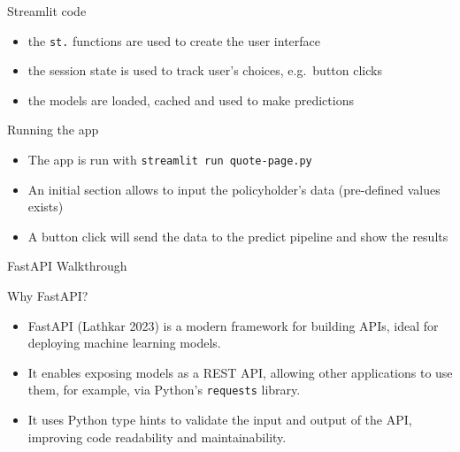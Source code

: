 \documentclass[
  ignorenonframetext,
]{beamer}
\providecommand{\tightlist}{%
  \setlength{\itemsep}{0pt}\setlength{\parskip}{0pt}}
\begin{document}
\begin{frame}[fragile]
\begin{block}{Streamlit code}
\label{streamlit-code}
\begin{itemize}
\tightlist
\item
  the \texttt{st.} functions are used to create the user interface
\item
  the session state is used to track user's choices, e.g.~button clicks
\item
  the models are loaded, cached and used to make predictions
\end{itemize}
\end{block}
\end{frame}

\begin{frame}[fragile]
\begin{block}{Running the app}
\label{running-the-app}
\begin{itemize}
\tightlist
\item
  The app is run with \texttt{streamlit\ run\ quote-page.py}
\item
  An initial section allows to input the policyholder's data
  (pre-defined values exists)
\item
  A button click will send the data to the predict pipeline and show the
  results
\end{itemize}
\end{block}
\end{frame}

\begin{frame}[fragile]{FastAPI Walkthrough}
\label{fastapi-walkthrough}
\begin{block}{Why FastAPI?}
\label{why-fastapi}
\begin{itemize}
\tightlist
\item
  FastAPI (Lathkar 2023) is a modern framework for building APIs, ideal
  for deploying machine learning models.
\item
  It enables exposing models as a REST API, allowing other applications
  to use them, for example, via Python's \texttt{requests} library.
\item
  It uses Python type hints to validate the input and output of the API,
  improving code readability and maintainability.
\end{itemize}
\end{block}
\end{frame}
\end{document}
